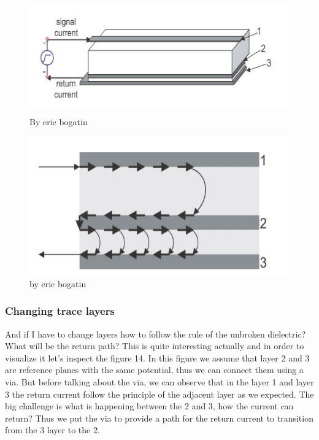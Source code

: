 \documentclass[12pt]{article}
\begin{document}
\begin{figure}[h!]
	\centering
	\begin{minipage}[b]{0.4\textwidth}
		\includegraphics[keepaspectratio, width=\textwidth]{assets/broken_dielectric.png}
		\caption{By eric bogatin}
	\end{minipage}
	\hfill
	\begin{minipage}[b]{0.4\textwidth}
		\includegraphics[width=\textwidth]{assets/side_current.png}
		\caption{by eric bogatin}
	\end{minipage}
\end{figure}

\subsubsection{Changing trace layers}

And if I have to change layers how to follow the rule of the unbroken dielectric? What will be the return path? This is quite interesting actually and in order to visualize it let's inspect the figure 14.	In this figure we assume that layer 2 and 3 are reference planes with the same potential, thus we can connect them using a via. But before talking about the via, we can observe that in the layer 1 and layer 3 the return current follow the principle of the adjacent layer as we expected. The big challenge is what is happening between the 2 and 3, how the current can return? Thus we put the via to provide a path for the return current to transition from the 3 layer to the 2.
\end{document}
